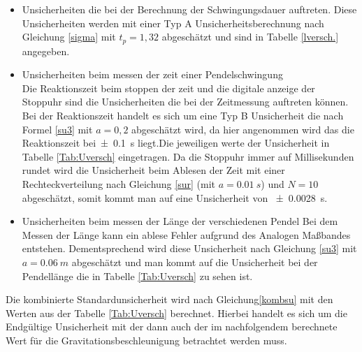 \begin{itemize}
	\item Unsicherheiten die bei der Berechnung der Schwingungsdauer auftreten.
	Diese Unsicherheiten werden mit einer Typ A Unsicherheitsberechnung nach Gleichung \ref{sigma} mit $t_p = 1,32$ abgeschätzt und sind in Tabelle \ref{lversch.} angegeben.
	\item Unsicherheiten beim messen der zeit einer Pendelschwingung\\
	Die Reaktionszeit beim stoppen der zeit und die digitale anzeige der Stoppuhr sind die Unsicherheiten die bei der Zeitmessung auftreten können. Bei der Reaktionszeit handelt es sich um eine Typ B Unsicherheit die nach Formel \ref{su3} mit $a=0,2$ abgeschätzt wird, da hier angenommen wird das die Reaktionszeit bei\SI{+- 0,1}{s} liegt.Die jeweiligen werte der Unsicherheit in Tabelle \ref{Tab:Uversch} eingetragen. Da die Stoppuhr immer auf Millisekunden rundet wird die Unsicherheit beim Ablesen der Zeit  mit einer Rechteckverteilung nach Gleichung \ref{sur} (mit $a=\SI{0,01}{s}$) und $N=10$abgeschätzt,  somit kommt man auf eine Unsicherheit von \SI{+-0,0028}{s}.

	\item Unsicherheiten beim messen der Länge der verschiedenen Pendel
	Bei dem Messen der Länge kann ein ablese Fehler aufgrund des Analogen Maßbandes entstehen. Dementsprechend wird diese Unsicherheit nach Gleichung \ref{su3} mit $a= \SI{0,06}{m}$ abgeschätzt und man kommt auf die Unsicherheit bei der Pendellänge die in Tabelle \ref{Tab:Uversch} zu sehen ist. 

\end{itemize}
 Die kombinierte Standardunsicherheit wird nach Gleichung\ref{kombsu} mit den Werten  aus der Tabelle \ref{Tab:Uversch} berechnet.
 Hierbei handelt es sich um die Endgültige Unsicherheit mit der dann auch der im nachfolgendem berechnete Wert für die Gravitationsbeschleunigung betrachtet werden muss. 
 
